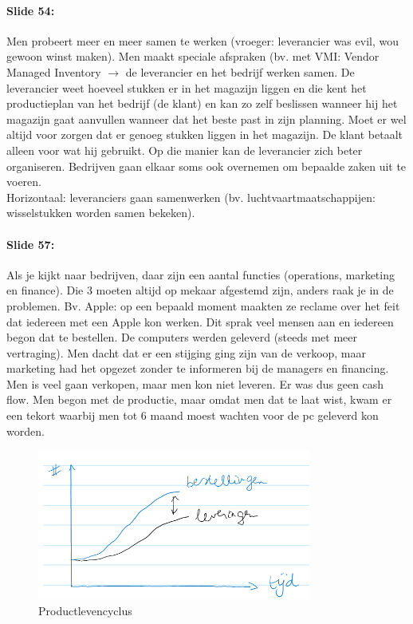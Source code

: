 \documentclass[10pt,a4paper]{report}
\begin{document}
\paragraph{Slide 54:} Men probeert meer en meer samen te werken (vroeger: leverancier was evil, wou gewoon winst maken). Men maakt speciale afspraken (bv. met VMI: Vendor Managed Inventory $\rightarrow$ de leverancier en het bedrijf werken samen. De leverancier weet hoeveel stukken er in het magazijn liggen en die kent het productieplan van het bedrijf (de klant) en kan zo zelf beslissen wanneer hij het magazijn gaat aanvullen wanneer dat het beste past in zijn planning. Moet er wel altijd voor zorgen dat er genoeg stukken liggen in het magazijn. De klant betaalt alleen voor wat hij gebruikt. Op die manier kan de leverancier zich beter organiseren. Bedrijven gaan elkaar soms ook overnemen om bepaalde zaken uit te voeren.\\
Horizontaal: leveranciers gaan samenwerken (bv. luchtvaartmaatschappijen: wisselstukken worden samen bekeken).

\paragraph{Slide 57:} Als je kijkt naar bedrijven, daar zijn een aantal functies (operations, marketing en finance). Die 3 moeten altijd op mekaar afgestemd zijn, anders raak je in de problemen. Bv. Apple: op een bepaald moment maakten ze reclame over het feit dat iedereen met een Apple kon werken. Dit sprak veel mensen aan en iedereen begon dat te bestellen. De computers werden geleverd (steeds met meer vertraging). Men dacht dat er een stijging ging zijn van de verkoop, maar marketing had het opgezet zonder te informeren bij de managers en financing. Men is veel gaan verkopen, maar men kon niet leveren. Er was dus geen cash flow. Men begon met de productie, maar omdat men dat te laat wist, kwam er een tekort waarbij men tot 6 maand moest wachten voor de pc geleverd kon worden.


\begin{figure}[h!]
\centering
\includegraphics[width=90mm]{Les2_01.png}
\caption{Productlevencyclus} 
\label{les2_01}
\end{figure}
\end{document}
